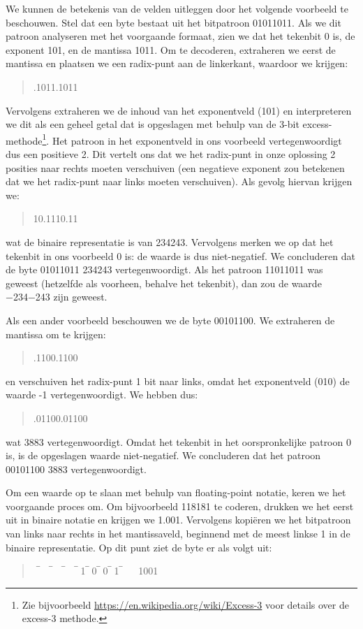 We kunnen de betekenis van de velden uitleggen door het volgende voorbeeld te beschouwen. Stel dat een byte bestaat uit het bitpatroon 01011011. Als we dit patroon analyseren met het voorgaande formaat, zien we dat het tekenbit 0 is, de exponent 101, en de mantissa 1011. Om te decoderen, extraheren we eerst de mantissa en plaatsen we een radix-punt aan de linkerkant, waardoor we krijgen:
\begin{quote}
.1011.1011
\end{quote}
%
Vervolgens extraheren we de inhoud van het exponentveld (101) en interpreteren we dit als een geheel getal dat is opgeslagen met behulp van de 3-bit excess-methode\footnote{Zie bijvoorbeeld \url{https://en.wikipedia.org/wiki/Excess-3} voor details over de excess-3 methode.}. Het patroon in het exponentveld in ons voorbeeld vertegenwoordigt dus een positieve 2. Dit vertelt ons dat we het radix-punt in onze oplossing 2 posities naar rechts moeten verschuiven (een negatieve exponent zou betekenen dat we het radix-punt naar links moeten verschuiven). Als gevolg hiervan krijgen we:
\begin{quote}
10.1110.11
\end{quote}
%
wat de binaire representatie is van 234243​. Vervolgens merken we op dat het tekenbit in ons voorbeeld 0 is: de waarde is dus niet-negatief. We concluderen dat de byte 01011011 234243​ vertegenwoordigt. Als het patroon 11011011 was geweest (hetzelfde als voorheen, behalve het tekenbit), dan zou de waarde −234−243​ zijn geweest.

Als een ander voorbeeld beschouwen we de byte 00101100. We extraheren de mantissa om te krijgen:
\begin{quote}
.1100.1100
\end{quote}
%
en verschuiven het radix-punt 1 bit naar links, omdat het exponentveld (010) de waarde -1 vertegenwoordigt. We hebben dus:
\begin{quote}
.01100.01100
\end{quote}
%
wat 3883​ vertegenwoordigt. Omdat het tekenbit in het oorspronkelijke patroon 0 is, is de opgeslagen waarde niet-negatief. We concluderen dat het patroon 00101100 3883​ vertegenwoordigt.

Om een waarde op te slaan met behulp van floating-point notatie, keren we het voorgaande proces om. Om bijvoorbeeld 118181​ te coderen, drukken we het eerst uit in binaire notatie en krijgen we 1.001. Vervolgens kopiëren we het bitpatroon van links naar rechts in het mantissaveld, beginnend met de meest linkse 1 in de binaire representatie. Op dit punt ziet de byte er als volgt uit:
\begin{quote}
   ‾     ‾     ‾     ‾  1‾  0‾  0‾  1‾   ​ ​ ​ ​1​0​0​1​
\end{quote}

